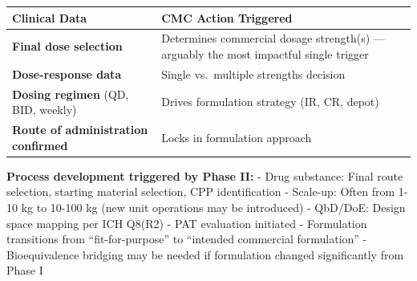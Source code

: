 \documentclass[
  11pt,
  a4paper,
]{report}
\begin{document}
\begin{longtable}[]{@{}ll@{}}
\toprule
\begin{minipage}[b]{0.39\columnwidth}\raggedright
Clinical Data\strut
\end{minipage} & \begin{minipage}[b]{0.55\columnwidth}\raggedright
CMC Action Triggered\strut
\end{minipage}\tabularnewline
\midrule
\endhead
\begin{minipage}[t]{0.39\columnwidth}\raggedright
\textbf{Final dose selection}\strut
\end{minipage} & \begin{minipage}[t]{0.55\columnwidth}\raggedright
Determines commercial dosage strength(s) --- arguably the most impactful
single trigger\strut
\end{minipage}\tabularnewline
\begin{minipage}[t]{0.39\columnwidth}\raggedright
\textbf{Dose-response data}\strut
\end{minipage} & \begin{minipage}[t]{0.55\columnwidth}\raggedright
Single vs.~multiple strengths decision\strut
\end{minipage}\tabularnewline
\begin{minipage}[t]{0.39\columnwidth}\raggedright
\textbf{Dosing regimen} (QD, BID, weekly)\strut
\end{minipage} & \begin{minipage}[t]{0.55\columnwidth}\raggedright
Drives formulation strategy (IR, CR, depot)\strut
\end{minipage}\tabularnewline
\begin{minipage}[t]{0.39\columnwidth}\raggedright
\textbf{Route of administration confirmed}\strut
\end{minipage} & \begin{minipage}[t]{0.55\columnwidth}\raggedright
Locks in formulation approach\strut
\end{minipage}\tabularnewline
\bottomrule
\end{longtable}

\textbf{Process development triggered by Phase II:} - Drug substance:
Final route selection, starting material selection, CPP identification -
Scale-up: Often from 1-10 kg to 10-100 kg (new unit operations may be
introduced) - QbD/DoE: Design space mapping per ICH Q8(R2) - PAT
evaluation initiated - Formulation transitions from ``fit-for-purpose''
to ``intended commercial formulation'' - Bioequivalence bridging may be
needed if formulation changed significantly from Phase I
\end{document}
